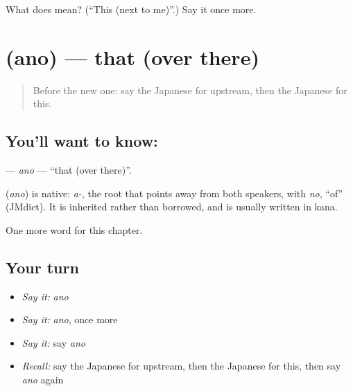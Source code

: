 \begin{tcolorbox}[breakable,colback=teal!4,colframe=teal!35!black,title={Before you move on}]
What does  mean? (\textquotedblleft{}This (next to me)\textquotedblright{}.) Say it once more.
\end{tcolorbox}
\section[\texorpdfstring{\ja{あの} (ano)}{あの (ano)}]{ (ano) — that (over there)}

\label{lesson:JA-C83-ano}



\begin{quote}
Before the new one: say the Japanese for upstream, then the Japanese for this.
\end{quote}

\subsection*{You'll want to know: }
\textbf{} — \emph{ano} — \textquotedblleft{}that (over there)\textquotedblright{}.

\begin{cousinweb}
\textbf{} (\emph{ano}) is native: \emph{a-}, the root that points away from both speakers, with \emph{no}, \textquotedblleft{}of\textquotedblright{} (JMdict). It is inherited rather than borrowed, and is usually written in kana.
\end{cousinweb}

\begin{grammarlens}[title={What you've built}]
One more word for this chapter.
\end{grammarlens}

\subsection*{Your turn}
\begin{itemize}
\raggedright
  \item \emph{Say it:} \emph{ano}
  \item \emph{Say it:} \emph{ano}, once more
  \item \emph{Say it:} say \emph{ano}
  \item \emph{Recall:} say the Japanese for upstream, then the Japanese for this, then say \emph{ano} again
\end{itemize}

